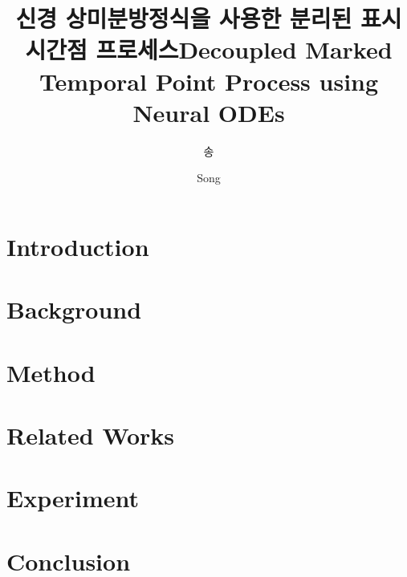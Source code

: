 \documentclass[master,english,final]{postech-ucs}
\title[korean]{신경 상미분방정식을 사용한 분리된 표시 시간점 프로세스}
\title[english]{Decoupled Marked Temporal Point Process using Neural ODEs}
\author[korean]{송}{유지}
\author[english]{Song}{Yujee}
\begin{document}

    \begin{abstract}
        
    \end{abstract}

    \tableofcontents

    \listoftables

    \listoffigures



\chapter{Introduction}
% 


\chapter{Background}
% 


\chapter{Method}
% 


\chapter{Related Works}
% 


\chapter{Experiment}
% 


\chapter{Conclusion}
% 

\end{document}
